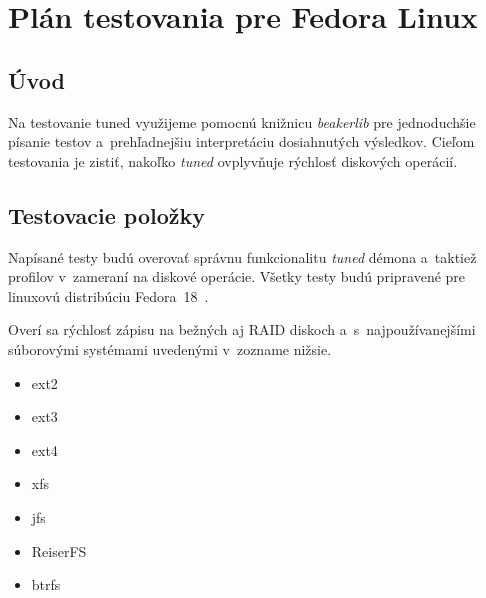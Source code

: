 %
%

\chapter{Plán testovania pre Fedora Linux}


\section{Úvod}

Na testovanie tuned využijeme pomocnú knižnicu \emph{beakerlib}
\cite{beakerlibHomepage} pre jednoduchšie písanie testov a~prehľadnejšiu
interpretáciu dosiahnutých výsledkov. Cieľom testovania je zistiť, nakoľko
\emph{tuned} ovplyvňuje rýchlosť diskových operácií.

\section{Testovacie položky}

Napísané testy budú overovať správnu funkcionalitu \emph{tuned} démona a~taktiež
profilov v~zameraní na diskové operácie. Všetky testy budú
pripravené pre linuxovú distribúciu Fedora~18~\cite{fedoraHomepage}.

Overí sa rýchlosť zápisu na bežných aj RAID diskoch a~s~najpoužívanejšími
súborovými systémami uvedenými v~zozname nižsie.

\begin{itemize}
    \item ext2
    \item ext3
    \item ext4
    \item xfs
    \item jfs
    \item ReiserFS
    \item btrfs
\end{itemize}


